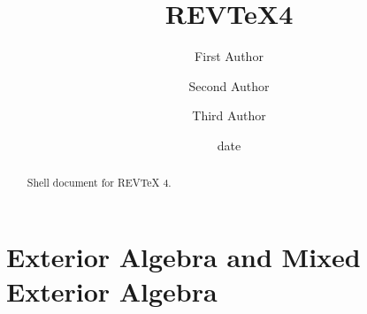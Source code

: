 \documentclass[aps,preprint]{revtex4}%
\begin{document}
\title[Short title for running header]{REV\TeX4}
\author{First Author}
\author{Second Author}
\author{Third Author}

\begin{abstract}
Shell document for REV\TeX{} 4.

\end{abstract}
\date[Date text]{date}




\maketitle
\tableofcontents


\section{Exterior Algebra and Mixed Exterior Algebra}
\end{document}
